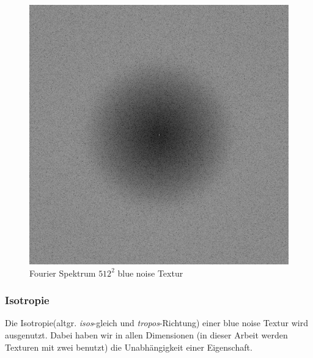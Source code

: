 \begin{figure}[H]
\begin{minipage}[t]{0.45\linewidth}
        \includegraphics[width=\linewidth]{content/BlueNoise/Bilder/FFT_LDR_LLL1_0.png}
        \caption{Fourier Spektrum $512^{2}$ blue noise Textur}
    \end{minipage}
\end{figure}



\subsubsection{Isotropie}
Die Isotropie(altgr. \textit{isos}-gleich und \textit{tropos}-Richtung)
einer blue noise Textur wird ausgenutzt. Dabei haben wir in allen
Dimensionen (in dieser Arbeit werden Texturen mit zwei benutzt) 
die Unabhängigkeit einer Eigenschaft. 

